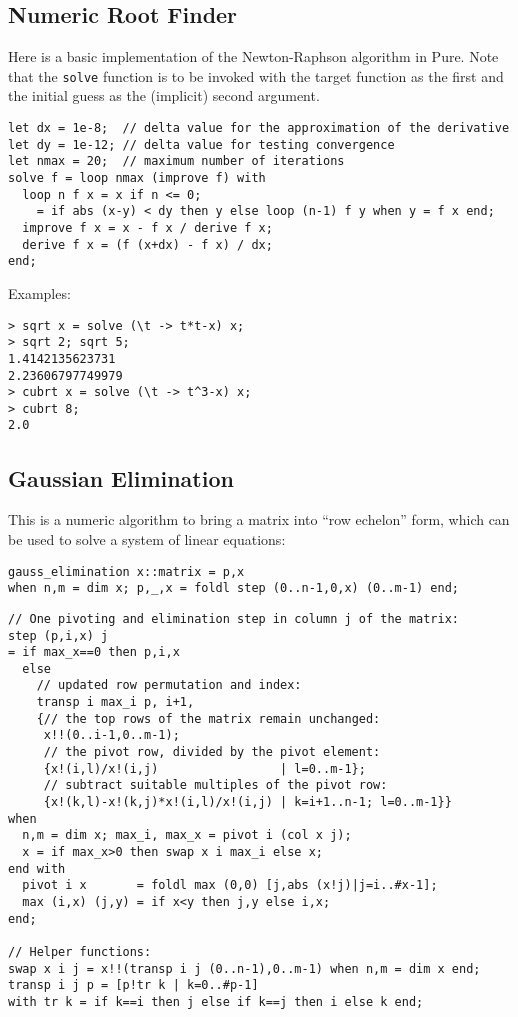 \documentclass[a4paper,12pt]{article}
\begin{document}
\subsection{Numeric Root Finder}

Here is a basic implementation of the Newton-Raphson algorithm in Pure. Note
that the \verb|solve| function is to be invoked with the target function as
the first and the initial guess as the (implicit) second argument.

\begin{lstlisting}
let dx = 1e-8;  // delta value for the approximation of the derivative
let dy = 1e-12; // delta value for testing convergence
let nmax = 20;  // maximum number of iterations
solve f = loop nmax (improve f) with
  loop n f x = x if n <= 0;
    = if abs (x-y) < dy then y else loop (n-1) f y when y = f x end;
  improve f x = x - f x / derive f x;
  derive f x = (f (x+dx) - f x) / dx;
end;
\end{lstlisting}

\noindent Examples:

\begin{lstlisting}
> sqrt x = solve (\t -> t*t-x) x;
> sqrt 2; sqrt 5;
1.4142135623731
2.23606797749979
> cubrt x = solve (\t -> t^3-x) x;
> cubrt 8;
2.0
\end{lstlisting}

\subsection{Gaussian Elimination}

This is a numeric algorithm to bring a matrix into ``row echelon'' form, which
can be used to solve a system of linear equations:

\begin{lstlisting}
gauss_elimination x::matrix = p,x
when n,m = dim x; p,_,x = foldl step (0..n-1,0,x) (0..m-1) end;
\end{lstlisting}

\begin{lstlisting}
// One pivoting and elimination step in column j of the matrix:
step (p,i,x) j
= if max_x==0 then p,i,x
  else
    // updated row permutation and index:
    transp i max_i p, i+1,
    {// the top rows of the matrix remain unchanged:
     x!!(0..i-1,0..m-1);
     // the pivot row, divided by the pivot element:
     {x!(i,l)/x!(i,j)                 | l=0..m-1};
     // subtract suitable multiples of the pivot row:
     {x!(k,l)-x!(k,j)*x!(i,l)/x!(i,j) | k=i+1..n-1; l=0..m-1}}
when
  n,m = dim x; max_i, max_x = pivot i (col x j);
  x = if max_x>0 then swap x i max_i else x;
end with
  pivot i x       = foldl max (0,0) [j,abs (x!j)|j=i..#x-1];
  max (i,x) (j,y) = if x<y then j,y else i,x;
end;

// Helper functions:
swap x i j = x!!(transp i j (0..n-1),0..m-1) when n,m = dim x end;
transp i j p = [p!tr k | k=0..#p-1]
with tr k = if k==i then j else if k==j then i else k end;
\end{lstlisting}
\end{document}
